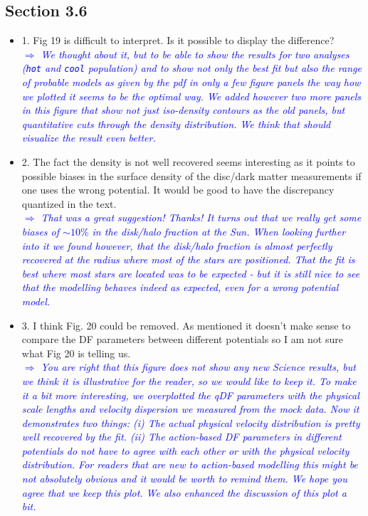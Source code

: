 \documentclass[10pt,a4paper]{article}
\newcommand{\Comment}[1]{\textsl{\textcolor{Blue}{$\Longrightarrow$ {#1}}}}
\begin{document}
\subsection{Section 3.6}
\begin{itemize}
\item 1. Fig 19 is difficult to interpret. Is it possible to display the difference? \\\Comment{We thought about it, but to be able to show the results for two analyses (\texttt{hot} and \texttt{cool} population) and to show not only the best fit but also the range of probable models as given by the pdf in only a few figure panels the way how we plotted it seems to be the optimal way. We added however two more panels in this figure that show not just iso-density contours as the old panels, but quantitative cuts through the density distribution. We think that should visualize the result even better.} 
\item 2. The fact the density is not well recovered seems interesting as it points to possible biases in the surface density of the disc/dark matter measurements if one uses the wrong potential. It would be good to have the discrepancy quantized in the text. \\\Comment{That was a great suggestion! Thanks! It turns out that we really get some biases of $\sim10\%$ in the disk/halo fraction at the Sun. When looking further into it we found however, that the disk/halo fraction is almost perfectly recovered at the radius where most of the stars are positioned. That the fit is best where most stars are located was to be expected - but it is still nice to see that the modelling behaves indeed as expected, even for a wrong potential model.}
\item 3. I think Fig. 20 could be removed. As mentioned it doesn't make sense to compare the DF parameters between different potentials so I am not sure what Fig 20 is telling us. \\\Comment{You are right that this figure does not show any new Science results, but we think it is illustrative for the reader, so we would like to keep it. To make it a bit more interesting, we overplotted the qDF parameters with the physical scale lengths and velocity dispersion we measured from the mock data. Now it demonstrates two things: (i) The actual physical velocity distribution is pretty well recovered by the fit. (ii) The action-based DF parameters in different potentials do not have to agree with each other or with the physical velocity distribution. For readers that are new to action-based modelling this might be not absolutely obvious and it would be worth to remind them. We hope you agree that we keep this plot. We also enhanced the discussion of this plot a bit.}

\end{itemize}
\end{document}
